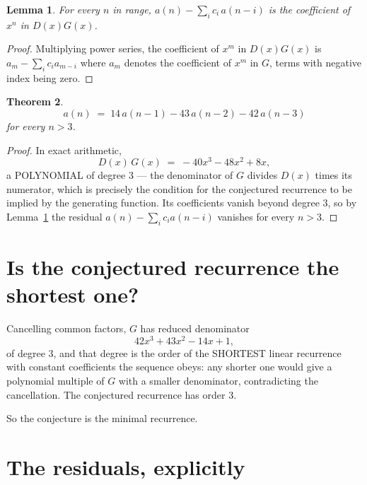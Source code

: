 \documentclass[11pt,a4paper]{article}
\theoremstyle{plain}
\newtheorem{theorem}{Theorem}
\newtheorem{lemma}[theorem]{Lemma}
\theoremstyle{definition}
\begin{document}
\begin{lemma}\label{lem:key}
For every $n$ in range, $a(n)-\sum_i c_i\,a(n-i)$ is the coefficient of $x^{n}$ in
$D(x)G(x)$.
\end{lemma}

\begin{proof}
Multiplying power series, the coefficient of $x^{m}$ in $D(x)G(x)$ is
$a_m-\sum_i c_i a_{m-i}$ where $a_m$ denotes the coefficient of $x^{m}$ in $G$, terms with
negative index being zero.
\end{proof}

\begin{theorem}
\[
a(n)\;=\;14\,a(n-1) - 43\,a(n-2) - 42\,a(n-3)
\]
for every $n>3$.
\end{theorem}

\begin{proof}
In exact arithmetic,
\[
D(x)\,G(x)\;=\;- 40 x^{3} - 48 x^{2} + 8 x,
\]
a POLYNOMIAL of degree $3$ --- the denominator of $G$ divides $D(x)$ times its numerator,
which is precisely the condition for the conjectured recurrence to be implied by the
generating function. Its coefficients vanish beyond degree $3$, so by
Lemma~\ref{lem:key} the residual $a(n)-\sum_ic_ia(n-i)$ vanishes for every
$n>3$.
\end{proof}

\section{Is the conjectured recurrence the shortest one?}

Cancelling common factors, $G$ has reduced denominator
\[
42 x^{3} + 43 x^{2} - 14 x + 1,
\]
of degree $3$, and that degree is the order of the SHORTEST linear recurrence with
constant coefficients the sequence obeys: any shorter one would give a polynomial multiple of
$G$ with a smaller denominator, contradicting the cancellation. The conjectured recurrence has
order $3$.

So the conjecture is the minimal recurrence.

\section{The residuals, explicitly}
\end{document}

